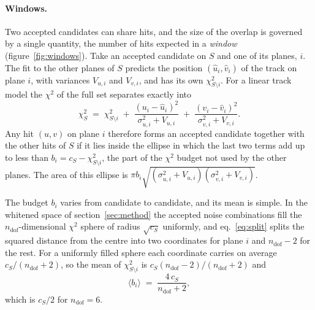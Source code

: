 \IfFileExists{jinst.cls}{\documentclass[a4paper,11pt]{jinst}}
\newcommand{\ndof}{n_\mathrm{dof}}
\begin{document}
\paragraph{Windows.} Two accepted candidates can share hits, and the size of the overlap is
governed by a single quantity, the number of hits expected in a \emph{window}
(figure~\ref{fig:windows}). Take an accepted candidate on $S$ and one of its planes, $i$. The
fit to the other planes of $S$ predicts the position $(\hat u_i,\hat v_i)$ of the track on plane
$i$, with variances $V_{u,i}$ and $V_{v,i}$, and has its own $\chi^2_{S\setminus i}$. For a
linear track model the $\chi^2$ of the full set separates exactly into
\begin{equation}
  \chi^2_S \;=\; \chi^2_{S\setminus i} \;+\; \frac{(u_i-\hat u_i)^2}{\sigma_{u,i}^2+V_{u,i}}
  \;+\; \frac{(v_i-\hat v_i)^2}{\sigma_{v,i}^2+V_{v,i}} .
  \label{eq:split}
\end{equation}
Any hit $(u,v)$ on plane $i$ therefore forms an accepted candidate together with the other
hits of $S$ if it lies inside the ellipse in which the last two terms add up to less than
$b_i=c_S-\chi^2_{S\setminus i}$, the part of the $\chi^2$ budget not used by the other planes.
The area of this ellipse is $\pi b_i\sqrt{(\sigma_{u,i}^2+V_{u,i})(\sigma_{v,i}^2+V_{v,i})}$.

The budget $b_i$ varies from candidate to candidate, and its mean is simple. In the whitened
space of section~\ref{sec:method} the accepted noise combinations fill the $\ndof$-dimensional $\chi^2$
sphere of radius $\sqrt{c_S}$ uniformly, and eq.~\eqref{eq:split} splits the squared distance
from the centre into two coordinates for plane $i$ and $\ndof-2$ for the rest. For a uniformly
filled sphere each coordinate carries on average $c_S/(\ndof+2)$, so the mean of
$\chi^2_{S\setminus i}$ is $c_S(\ndof-2)/(\ndof+2)$ and
\begin{equation}
  \langle b_i\rangle \;=\; \frac{4\,c_S}{\ndof+2} ,
  \label{eq:budget}
\end{equation}
which is $c_S/2$ for $\ndof=6$.
\end{document}
